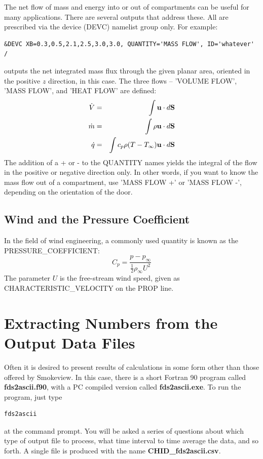 \documentclass[11pt]{book}
\newcommand{\dS}{{d\bf S}}
\newcommand{\bu}{{\bf u}}
\newcommand{\ha}{\frac{1}{2}}
\begin{document}
The net flow of mass and energy into or out of compartments can be useful for many applications. There are several outputs that address these. All are prescribed via
the device ({\ct DEVC}) namelist group only. For example:

\footnotesize
\begin{verbatim}
&DEVC XB=0.3,0.5,2.1,2.5,3.0,3.0, QUANTITY='MASS FLOW', ID='whatever' /
\end{verbatim}
\normalsize

\noindent
outputs the net integrated mass flux through the given planar area, oriented in the positive $z$ direction, in this case. The three flows -- {\ct 'VOLUME FLOW'}, {\ct 'MASS FLOW'},
and {\ct 'HEAT FLOW'} are defined:
\begin{eqnarray*} \dot{V} &=& \int \bu \cdot \dS  \\
                  \dot{m} &=& \int \rho \bu \cdot \dS \\
                  \dot{q} &=& \int c_p \rho (T-T_\infty) \bu \cdot \dS  \end{eqnarray*}
The addition of a {\ct +} or {\ct -} to the {\ct QUANTITY} names yields the integral of the flow in the positive or negative direction only. In other words, if you want to know
the mass flow out of a compartment, use {\ct 'MASS FLOW +'} or {\ct 'MASS FLOW -'}, depending on the orientation of the door.


\subsection{Wind and the Pressure Coefficient}
\label{info:wind}

In the field of wind engineering, a commonly used quantity is known as the {\ct PRESSURE\_COEFFICIENT}:
$$ C_p = \frac{p-p_\infty}{\ha \rho_\infty U^2} $$
The parameter $U$ is the free-stream wind speed, given as {\ct CHARACTERISTIC\_VELOCITY} on the {\ct PROP} line.






\section{Extracting Numbers from the Output Data Files}
\label{info:fds2ascii}

Often it is desired to present results of calculations in some form other
than those offered by Smokeview. In this case, there is a short
Fortran 90 program called {\bf fds2ascii.f90}, with a PC compiled version
called {\bf fds2ascii.exe}. To run the program, just type
\begin{verbatim}
fds2ascii
\end{verbatim}
at the command prompt. You will be asked a series of questions
about which type of output file to process, what time interval to
time average the data, and so forth. A single file is produced
with the name {\bf CHID\_fds2ascii.csv}.
\end{document}
